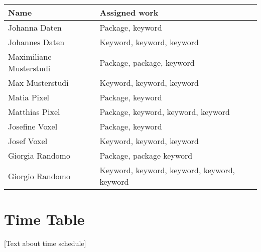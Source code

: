 \documentclass[lang=english,inputenc=utf8,fontsize=10pt]{ldvarticle}
\begin{document}
\begin{center}
	\begin{footnotesize}
		\setlength{\arrayrulewidth}{1,05pt}
		\begin{tabular}[htb]{|p{3cm}|p{9.1cm}|}
			\hline
			\textbf{Name} & \textbf{Assigned work} \\
			\hline
			\hline
			\rowcolor{lightgray} Johanna Daten & Package, keyword \\
			\hline
			\rowcolor{lightgray} Johannes Daten & Keyword, keyword, keyword \\
			\hline	
			\rowcolor{lightgray} Maximiliane Musterstudi & Package, package, keyword \\
			\hline
			\rowcolor{lightgray} Max Musterstudi & Keyword, keyword, keyword \\
			\hline
			\rowcolor{lightgray} Matia Pixel & Package, keyword \\
			\hline
			\rowcolor{lightgray} Matthias Pixel & Package, keyword, keyword, keyword \\
			\hline	
			\rowcolor{lightgray} Josefine Voxel & Package, keyword \\
			\hline
			\rowcolor{lightgray} Josef Voxel & Keyword, keyword, keyword \\
			\hline
			\rowcolor{lightgray} Giorgia Randomo & Package, package keyword \\
			\hline
			\rowcolor{lightgray} Giorgio Randomo & Keyword, keyword, keyword, keyword, keyword \\
			\hline	
		\end{tabular}
	\end{footnotesize}
\end{center}

\newpage

\section{Time Table}

[Text about time schedule] \lipsum[3-4]
\end{document}

